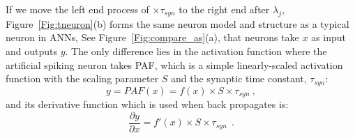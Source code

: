 \documentclass{article}
\begin{document}
If we move the left end process of $\times \tau_{syn}$ to the right end after $\lambda_j$, Figure~\ref{Fig:tneuron}(b) forms the same neuron model and structure as a typical neuron in ANNs, See Figure~\ref{Fig:compare_as}(a), that neurons take $x$ as input and outputs $y$.
The only difference lies in the activation function where the artificial spiking neuron takes PAF, which is a simple linearly-scaled activation function with the scaling parameter $S$ and the synaptic time constant, $\tau_{syn}$:
\begin{equation}
y = PAF(x) = f(x) \times S \times \tau_{syn}~,
\label{equ:PAF}
\end{equation}
and its derivative function which is used when back propagates is:
\begin{equation}
\frac{\partial y}{\partial x} = f'(x) \times S \times \tau_{syn}~~.
\end{equation}
\end{document}
